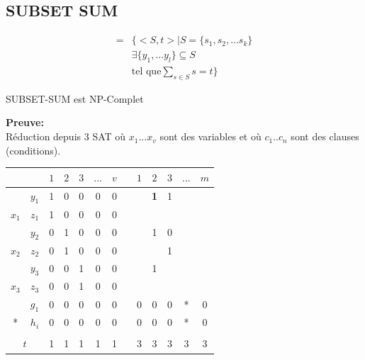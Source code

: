 \documentclass[a4paper,12pt]{article}
\begin{document}
  \subsection{SUBSET SUM}
    \begin{align*}
      = &\Big\{ <S, t> | S = \{s_1, s_2, ... s_k\}\\
      &\exists \{y_1, ... y_l\} \subseteq S\\
      &\text{tel que} \sum\limits_{s \in S} s = t \Big\}
    \end{align*}

    \begin{theoremeBox}
      SUBSET-SUM est NP-Complet
    \end{theoremeBox}
    \textbf{Preuve:}\\
    Réduction depuis 3 SAT où $x_1 ... x_v$ sont des variables et où $c_1 .. c_n$ sont des clauses (conditions).

    \begin{table}[h]
      \centering
      \begin{tabular}{c|c|c|c|c|c|c|c|c|c|c|c|c|}
	\cline{3-13}
	\multicolumn{2}{c|}{} & $1$ & $2$ & $3$ & $...$ & $v$ &  & $1$ & $2$ & $3$ & $...$ & $m$ \\ \hline
	\multicolumn{1}{|c|}{} & $y_1$ & 1 & 0 & 0 & 0 & 0 &  &  & {\color[HTML]{32CB00} \textbf{1}} & 1 &  &  \\ \cline{2-13}
	\multicolumn{1}{|c|}{\multirow{-2}{*}{$x_1$}} & $z_1$ & 1 & 0 & 0 & 0 & 0 &  &  &  &  &  &  \\ \hline
	\multicolumn{1}{|c|}{} & $y_2$ & 0 & 1 & 0 & 0 & 0 &  &  & 1 & 0 &  &  \\ \cline{2-13}
	\multicolumn{1}{|c|}{\multirow{-2}{*}{$x_2$}} & $z_2$ & 0 & 1 & 0 & 0 & 0 &  &  &  & {\color[HTML]{FD6864} 1} &  &  \\ \hline
	\multicolumn{1}{|c|}{} & $y_3$ & 0 & 0 & 1 & 0 & 0 &  &  & 1 &  &  &  \\ \cline{2-13}
	\multicolumn{1}{|c|}{\multirow{-2}{*}{$x_3$}} & $z_3$ & 0 & 0 & 1 & 0 & 0 &  &  &  &  &  &  \\ \hline
	\multicolumn{1}{|c|}{} & $g_1$ & 0 & 0 & 0 & 0 & 0 &  & 0 & 0 & 0 & * & 0 \\ \cline{2-13}
	\multicolumn{1}{|c|}{\multirow{-2}{*}{*}} & $h_i$ & 0 & 0 & 0 & 0 & 0 &  & 0 & 0 & 0 & * & 0 \\ \hline
	\multicolumn{2}{|c|}{} &  &  &  &  &  &  &  &  &  &  &  \\ \hline
	\multicolumn{2}{|c|}{$t$} & 1 & 1 & 1 & 1 & 1 &  & 3 & 3 & 3 & 3 & 3 \\ \hline
      \end{tabular}
    \end{table}
\end{document}
